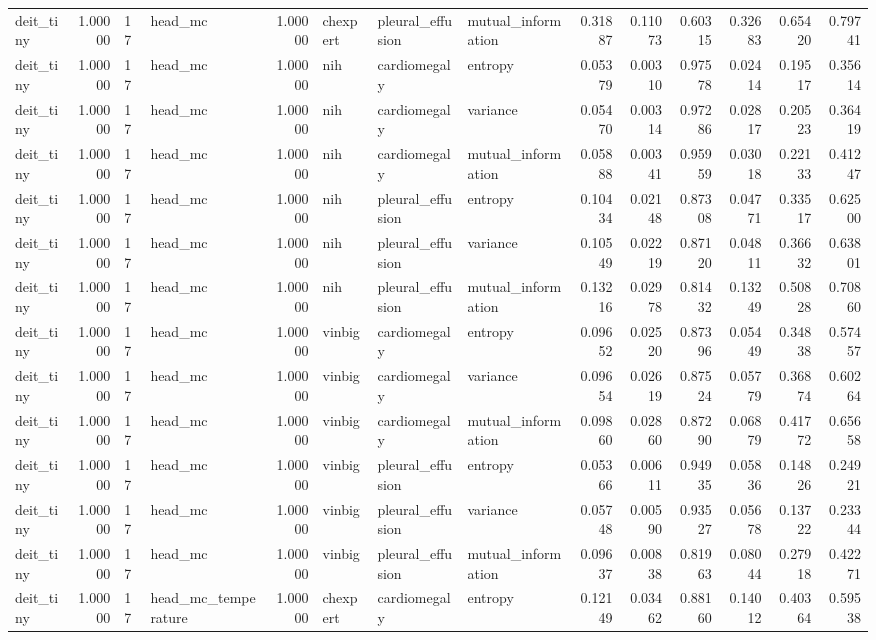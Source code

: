 \begin{tabular}{lrllrlllrrrrrr}
deit\_tiny & 1.00000 & 17 & head\_mc & 1.00000 & chexpert & pleural\_effusion & mutual\_information & 0.31887 & 0.11073 & 0.60315 & 0.32683 & 0.65420 & 0.79741 \\
deit\_tiny & 1.00000 & 17 & head\_mc & 1.00000 & nih & cardiomegaly & entropy & 0.05379 & 0.00310 & 0.97578 & 0.02414 & 0.19517 & 0.35614 \\
deit\_tiny & 1.00000 & 17 & head\_mc & 1.00000 & nih & cardiomegaly & variance & 0.05470 & 0.00314 & 0.97286 & 0.02817 & 0.20523 & 0.36419 \\
deit\_tiny & 1.00000 & 17 & head\_mc & 1.00000 & nih & cardiomegaly & mutual\_information & 0.05888 & 0.00341 & 0.95959 & 0.03018 & 0.22133 & 0.41247 \\
deit\_tiny & 1.00000 & 17 & head\_mc & 1.00000 & nih & pleural\_effusion & entropy & 0.10434 & 0.02148 & 0.87308 & 0.04771 & 0.33517 & 0.62500 \\
deit\_tiny & 1.00000 & 17 & head\_mc & 1.00000 & nih & pleural\_effusion & variance & 0.10549 & 0.02219 & 0.87120 & 0.04811 & 0.36632 & 0.63801 \\
deit\_tiny & 1.00000 & 17 & head\_mc & 1.00000 & nih & pleural\_effusion & mutual\_information & 0.13216 & 0.02978 & 0.81432 & 0.13249 & 0.50828 & 0.70860 \\
deit\_tiny & 1.00000 & 17 & head\_mc & 1.00000 & vinbig & cardiomegaly & entropy & 0.09652 & 0.02520 & 0.87396 & 0.05449 & 0.34838 & 0.57457 \\
deit\_tiny & 1.00000 & 17 & head\_mc & 1.00000 & vinbig & cardiomegaly & variance & 0.09654 & 0.02619 & 0.87524 & 0.05779 & 0.36874 & 0.60264 \\
deit\_tiny & 1.00000 & 17 & head\_mc & 1.00000 & vinbig & cardiomegaly & mutual\_information & 0.09860 & 0.02860 & 0.87290 & 0.06879 & 0.41772 & 0.65658 \\
deit\_tiny & 1.00000 & 17 & head\_mc & 1.00000 & vinbig & pleural\_effusion & entropy & 0.05366 & 0.00611 & 0.94935 & 0.05836 & 0.14826 & 0.24921 \\
deit\_tiny & 1.00000 & 17 & head\_mc & 1.00000 & vinbig & pleural\_effusion & variance & 0.05748 & 0.00590 & 0.93527 & 0.05678 & 0.13722 & 0.23344 \\
deit\_tiny & 1.00000 & 17 & head\_mc & 1.00000 & vinbig & pleural\_effusion & mutual\_information & 0.09637 & 0.00838 & 0.81963 & 0.08044 & 0.27918 & 0.42271 \\
deit\_tiny & 1.00000 & 17 & head\_mc\_temperature & 1.00000 & chexpert & cardiomegaly & entropy & 0.12149 & 0.03462 & 0.88160 & 0.14012 & 0.40364 & 0.59538 \\

\end{tabular}
